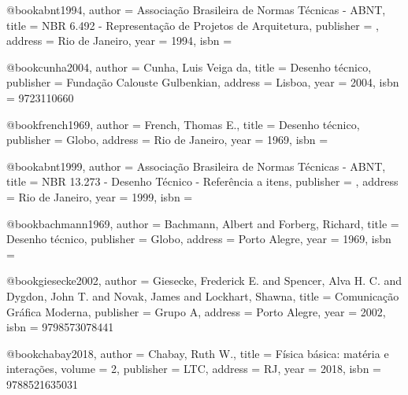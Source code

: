 @book{abnt1994,
  author = {{Associação Brasileira de Normas Técnicas - ABNT}},
  title = {NBR 6.492 - Representação de Projetos de Arquitetura},
  publisher = {},
  address = {Rio de Janeiro},
  year = {1994},
  isbn = {}
}

@book{cunha2004,
  author = {Cunha, Luis Veiga da},
  title = {Desenho técnico},
  publisher = {Fundação Calouste Gulbenkian},
  address = {Lisboa},
  year = {2004},
  isbn = {9723110660}
}

@book{french1969,
  author = {French, Thomas E.},
  title = {Desenho técnico},
  publisher = {Globo},
  address = {Rio de Janeiro},
  year = {1969},
  isbn = {}
}

@book{abnt1999,
  author = {{Associação Brasileira de Normas Técnicas - ABNT}},
  title = {NBR 13.273 - Desenho Técnico - Referência a itens},
  publisher = {},
  address = {Rio de Janeiro},
  year = {1999},
  isbn = {}
}

@book{bachmann1969,
  author = {Bachmann, Albert and Forberg, Richard},
  title = {Desenho técnico},
  publisher = {Globo},
  address = {Porto Alegre},
  year = {1969},
  isbn = {}
}

@book{giesecke2002,
  author = {Giesecke, Frederick E. and Spencer, Alva H. C. and Dygdon, John T. and Novak, James and Lockhart, Shawna},
  title = {Comunicação Gráfica Moderna},
  publisher = {Grupo A},
  address = {Porto Alegre},
  year = {2002},
  isbn = {9798573078441}
}

%

@book{chabay2018,
  author = {Chabay, Ruth W.},
  title = {Física básica: matéria e interações},
  volume = {2},
  publisher = {LTC},
  address = {RJ},
  year = {2018},
  isbn = {9788521635031}
}

